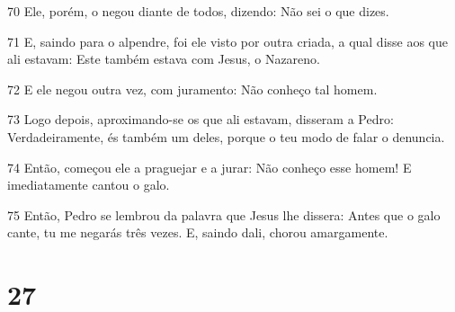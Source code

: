 \par 70 Ele, porém, o negou diante de todos, dizendo: Não sei o que dizes.
\par 71 E, saindo para o alpendre, foi ele visto por outra criada, a qual disse aos que ali estavam: Este também estava com Jesus, o Nazareno.
\par 72 E ele negou outra vez, com juramento: Não conheço tal homem.
\par 73 Logo depois, aproximando-se os que ali estavam, disseram a Pedro: Verdadeiramente, és também um deles, porque o teu modo de falar o denuncia.
\par 74 Então, começou ele a praguejar e a jurar: Não conheço esse homem! E imediatamente cantou o galo.
\par 75 Então, Pedro se lembrou da palavra que Jesus lhe dissera: Antes que o galo cante, tu me negarás três vezes. E, saindo dali, chorou amargamente.

\chapter{27}

